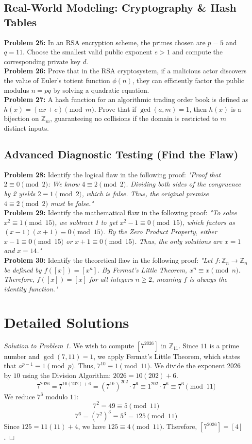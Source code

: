 \documentclass[11pt, a4paper]{article}
\theoremstyle{definition}
\theoremstyle{remark}
\newcommand{\Z}{\mathbb{Z}}
\begin{document}
\subsection{Real-World Modeling: Cryptography \& Hash Tables}
\textbf{Problem 25:} In an RSA encryption scheme, the primes chosen are $p=5$ and $q=11$. Choose the smallest valid public exponent $e > 1$ and compute the corresponding private key $d$. \\
\textbf{Problem 26:} Prove that in the RSA cryptosystem, if a malicious actor discovers the value of Euler's totient function $\phi(n)$, they can efficiently factor the public modulus $n = pq$ by solving a quadratic equation. \\
\textbf{Problem 27:} A hash function for an algorithmic trading order book is defined as $h(x) = (ax + c) \pmod m$. Prove that if $\gcd(a,m) = 1$, then $h(x)$ is a bijection on $\Z_m$, guaranteeing no collisions if the domain is restricted to $m$ distinct inputs.

\subsection{Advanced Diagnostic Testing (Find the Flaw)}
\textbf{Problem 28:} Identify the logical flaw in the following proof: \textit{"Proof that $2 \equiv 0 \pmod 2$: We know $4 \equiv 2 \pmod 2$. Dividing both sides of the congruence by 2 yields $2 \equiv 1 \pmod 2$, which is false. Thus, the original premise $4 \equiv 2 \pmod 2$ must be false."} \\
\textbf{Problem 29:} Identify the mathematical flaw in the following proof: \textit{"To solve $x^2 \equiv 1 \pmod{15}$, we subtract 1 to get $x^2 - 1 \equiv 0 \pmod{15}$, which factors as $(x-1)(x+1) \equiv 0 \pmod{15}$. By the Zero Product Property, either $x-1 \equiv 0 \pmod{15}$ or $x+1 \equiv 0 \pmod{15}$. Thus, the only solutions are $x=1$ and $x=14$."} \\
\textbf{Problem 30:} Identify the theoretical flaw in the following proof: \textit{"Let $f: \Z_n \to \Z_n$ be defined by $f([x]) = [x^n]$. By Fermat's Little Theorem, $x^n \equiv x \pmod n$. Therefore, $f([x]) = [x]$ for all integers $n \ge 2$, meaning $f$ is always the identity function."}

\newpage

\section{Detailed Solutions}

\begin{proof}[Solution to Problem 1]
We wish to compute $[7^{2026}]$ in $\Z_{11}$. Since $11$ is a prime number and $\gcd(7, 11) = 1$, we apply Fermat's Little Theorem, which states that $a^{p-1} \equiv 1 \pmod p$. Thus, $7^{10} \equiv 1 \pmod{11}$. 
We divide the exponent $2026$ by $10$ using the Division Algorithm: $2026 = 10(202) + 6$.
\[ 7^{2026} = 7^{10(202) + 6} = (7^{10})^{202} \cdot 7^6 \equiv 1^{202} \cdot 7^6 \equiv 7^6 \pmod{11} \]
We reduce $7^6$ modulo $11$:
\[ 7^2 = 49 \equiv 5 \pmod{11} \]
\[ 7^6 = (7^2)^3 \equiv 5^3 = 125 \pmod{11} \]
Since $125 = 11(11) + 4$, we have $125 \equiv 4 \pmod{11}$. Therefore, $[7^{2026}] = [4]$.
\end{proof}
\end{document}
